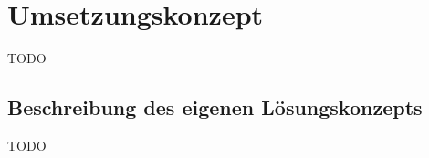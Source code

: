 \section{Umsetzungskonzept}
\label{sec:Umsetzungskonzept}
TODO

\subsection{Beschreibung des eigenen Lösungskonzepts}
\label{sub:Beschreibung des eigenen Lösungskonzepts}
TODO
